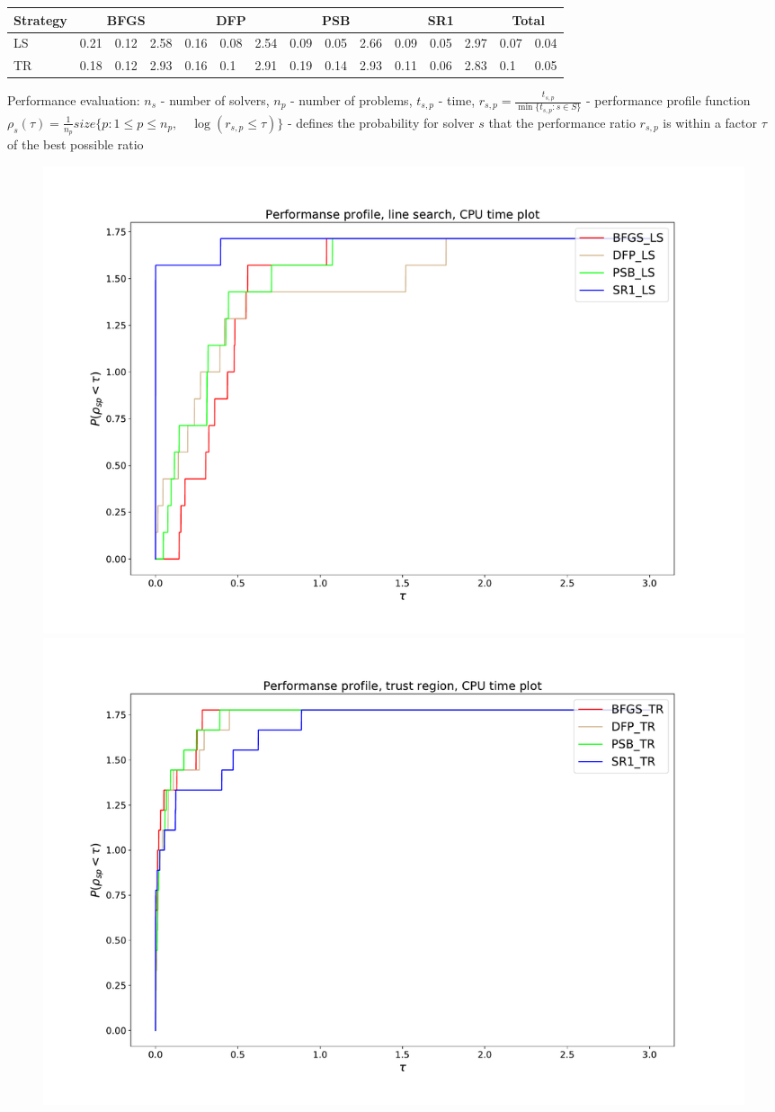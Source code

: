 \documentclass[a0]{a0poster}
\newcommand{\fr}{\frac}
\begin{document}
\begin{textblock}{7.1}
\begin{flushleft}
	\begin{tabular}{ p{3cm} |p{1.5cm}|p{1.5cm}|p{1.5cm}|p{1.5cm}|p{1.5cm}|p{1.5cm}|p{1.5cm}|p{1.5cm}|p{1.5cm}|p{1.5cm}|p{1.5cm}|p{1.5cm}|p{1.5cm}|p{1.5cm} }
		Strategy	& \multicolumn{3}{c|}{BFGS} & \multicolumn{3}{c|}{DFP} & \multicolumn{3}{c|}{PSB} & \multicolumn{3}{c|}{SR1} & \multicolumn{2}{c}{Total}\\
		\hline
		LS &0.21 &0.12& 2.58&0.16 &0.08&2.54&0.09 &0.05&2.66&0.09 &0.05&2.97&0.07 &0.04\\
		\hline
		TR&0.18&0.12&2.93&0.16&0.1&2.91& 0.19&0.14&2.93&0.11&0.06&2.83&0.1&0.05
	\end{tabular}
\end{flushleft}

Performance evaluation:
$n_s$ - number of solvers, $n_p$ -  number of problems,
$t_{s,p}$ - time, $r_{s,p} = \fr{t_{s,p}}{\min\{t_{s,p}: s\in S\}}$ - performance profile function\\
$\rho_s(\tau) = \fr{1}{n_p}size\{p:1\le p\le n_p, \quad\log(r_{s,p}\le \tau)\}$ - defines the probability for solver $s$ that the performance ratio $r_{s,p}$ is within a factor $\tau$ of the best possible ratio

\begin{figure}
	\includegraphics[width=.57\textwidth]{pic/line_search_profiling.pdf}
	\includegraphics[width=.57\textwidth]{pic/trust_region_profiling.pdf}
\end{figure}


\end{textblock}
\end{document}
